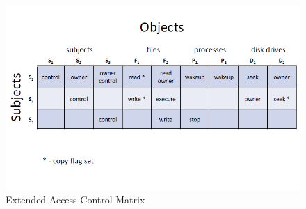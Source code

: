 \documentclass{article}
\begin{document}
                            \begin{figure}[h]
                                \begin{center}
                                    \includegraphics[scale=0.5]{../immagini/ExtendedAccessControlMatrix.png}
                                \end{center}
                                \caption{Extended Access Control Matrix}
                            \end{figure}   
                            
\end{document}
